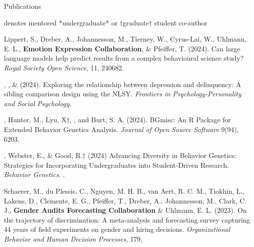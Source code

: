 \begin{rSection}{\textrm{Publications}}%
\vspace{-1mm}\begin{center}\footnotesize{denotes mentored *undergraduate* or $\dagger$graduate$\dagger$ student co-author}\end{center}\vspace{-1mm}
\begin{etaremune}

\item Lippert, S., Dreber, A., Johannesson, M., Tierney, W., Cyrus-Lai, W., Uhlmann, E. L., \textbf{Emotion Expression Collaboration}, \& Pfeiffer, T. (2024). Can large language models help predict results from a complex behavioural science study? \textit{Royal Society Open Science}, 11, 240682. 

\item \emsims, \jt, \& \meb (2024). Exploring the relationship between depression and delinquency: A sibling comparison design using the NLSY.  \textit{Frontiers in Psychology-Personality and Social Psychology}. 

\item \meb, Hunter, M., Lyu, X$\dagger$, \jdt, and Burt, S. A. (2024). BGmisc: An R Package for Extended Behavior Genetics Analysis. \textit{Journal of Open Source Software} 9(94), 6203. 
\item \meb, Webster, E.\noteA, \& Good, R.\noteA$\dagger$ (2024) Advancing Diversity in Behavior Genetics: Strategies for Incorporating Undergraduates into Student-Driven Research. \textit{Behavior Genetics}. . 
\item Schaerer, M., du Plessis, C., Nguyen, M. H. B., van Aert, R. C. M., Tiokhin, L., Lakens, D., Clemente, E. G., Pfeiffer, T., Dreber, A., Johannesson, M., Clark, C. J., \textbf{Gender Audits Forecasting Collaboration} \& Uhlmann, E. L. (2023). On the trajectory of discrimination: A meta-analysis and forecasting survey capturing 44 years of field experiments on gender and hiring decisions. \textit{Organizational Behavior and Human Decision Processes}, 179, 


\end{etaremune}
\end{rSection}
